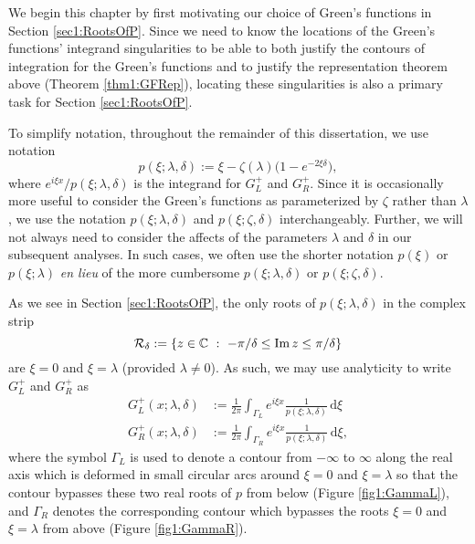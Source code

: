 \documentclass[../dissertation.tex]{subfiles}
\begin{document}
We begin this chapter by first motivating our choice of Green's functions
in Section \ref{sec1:RootsOfP}. 
Since we need to know the locations of the 
Green's functions' integrand singularities to be able to both justify 
the contours of integration for the Green's functions and
to justify the representation theorem above (Theorem \ref{thm1:GFRep}), 
locating these singularities is also a primary task for Section 
\ref{sec1:RootsOfP}.

To simplify notation, throughout the remainder of this dissertation, we use notation
\[
	p(\xi; \lambda, \delta) := \xi - \zeta(\lambda) \big( 1-e^{-2\xi \delta} \big),
	\label{sym:GFintegrand}
\]
where $e^{i\xi x} / p(\xi; \lambda, \delta)$ is the integrand for $G_L^+$ and $G_R^+$.
Since it is occasionally more useful to consider the Green's functions as parameterized 
by $\zeta$ rather than $\lambda$, we use the notation $p(\xi; \lambda, \delta)$ and
$p(\xi; \zeta, \delta)$ interchangeably. Further, we will not always need to consider
the af{}fects of the parameters $\lambda$ and $\delta$ in our subsequent analyses. In 
such cases, we often use the shorter notation $p(\xi)$ or $p(\xi;\lambda)$ \textit{en lieu} 
of the more cumbersome $p(\xi; \lambda, \delta)$ or $p(\xi; \zeta, \delta)$.

As we see in Section \ref{sec1:RootsOfP}, the only roots of $p(\xi; \lambda, \delta)$ 
in the complex strip 
\[
	\mathcal R_\delta := \{z \in \mathbb C ~:~ -\pi/\delta \leq \operatorname{Im} z \leq \pi/\delta \}	
\]
are $\xi = 0$ and $\xi = \lambda$ (provided $\lambda \ne 0$). As such, we may
use analyticity to write $G_L^+$ and $G_R^+$ as \label{sym:GFbndry}
\begin{align*}
	G_L^+(x; \lambda, \delta)
		&:= 
			\frac{1}{2\pi} 
			\int_{\Gamma_L} 
				e^{i\xi x} \frac{1}{p(\xi; \lambda, \delta)} 
			\, \mathrm{d}\xi \\
	G_R^+(x; \lambda, \delta) 
		&:= 
			\frac{1}{2\pi} 
				\int_{\Gamma_R} 
					e^{i\xi x} \frac{1}{p(\xi; \lambda, \delta)} 
				\, \mathrm{d}\xi,
\end{align*}
where the symbol $\Gamma_L$ \label{sym:Gamma} is used to denote a contour from $-\infty$ to 
$\infty$ along the real axis which is deformed in small circular arcs around 
$\xi = 0$ and $\xi=\lambda$ so that the contour bypasses these two real roots 
of $p$ from below (Figure \ref{fig1:GammaL}), and $\Gamma_R$ denotes the 
corresponding contour which bypasses
the roots $\xi = 0$ and $\xi=\lambda$ from above (Figure \ref{fig1:GammaR}). 
\end{document}
